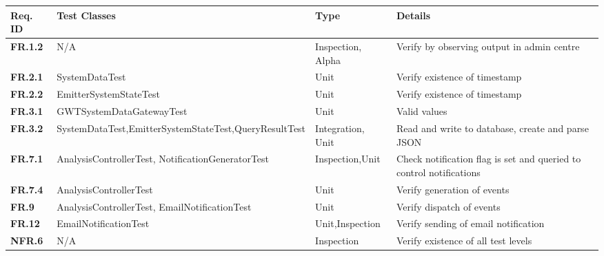 \documentclass[10pt,a4paper]{article}
\newcommand{\fr}[1]{\textcolor{reqColor}{\textbf{FR.#1}}}
\newcommand{\nfr}[1]{\textcolor{reqColor}{\textbf{NFR.#1}}}
\begin{document}
\begin{longtable}[H]{| p{1.5cm} | p{5cm}| p{1.8cm}| p{4.8cm}|}
  \hline\rowcolor{titleColor} \textbf{Req. ID} & \textbf{Test Classes} & \textbf{Type} & \textbf{Details}\\
  \hline \fr{1.2}   & N/A & Inspection, Alpha & Verify by observing output in admin centre\\
  \hline \fr{2.1}   & SystemDataTest & Unit & Verify existence of timestamp\\
  \hline \fr{2.2}   & EmitterSystemStateTest & Unit & Verify existence of timestamp\\
  \hline \fr{3.1}   & GWTSystemDataGatewayTest & Unit & Valid values\\
  \hline \fr{3.2}   & SystemDataTest,\newline EmitterSystemStateTest,\newline QueryResultTest & Integration, Unit & Read and write to database, create and parse JSON\\
  \hline \fr{7.1}   & AnalysisControllerTest, \newline NotificationGeneratorTest & Inspection,\newline Unit & Check notification flag is set and queried to control notifications\\
  \hline \fr{7.4}   & AnalysisControllerTest & Unit & Verify generation of events \\
  \hline \fr{9}   & AnalysisControllerTest, \newline EmailNotificationTest & Unit & Verify dispatch of events \\
  \hline \fr{12}    & EmailNotificationTest  & Unit,\newline Inspection & Verify sending of email notification \\
  \hline \nfr{6}    & N/A  & Inspection & Verify existence of all test levels \\
  \hline
\end{longtable}







\vfill


\end{document}
